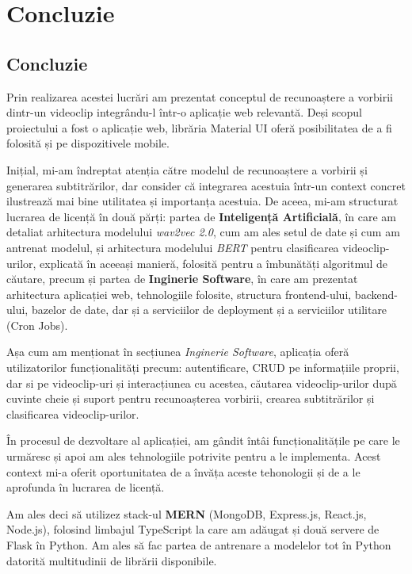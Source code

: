 \chapter{Concluzie}

\section{Concluzie}
Prin realizarea acestei lucrări am prezentat conceptul de recunoaștere a vorbirii dintr-un videoclip 
integrându-l într-o aplicație web relevantă. Deși scopul proiectului a fost o aplicație web,
librăria Material UI oferă posibilitatea de a fi folosită și pe dispozitivele mobile.
\par
Inițial, mi-am îndreptat atenția către modelul de recunoaștere a vorbirii și generarea subtitrărilor,
dar consider că  integrarea acestuia într-un context concret ilustrează mai bine utilitatea și
importanța acestuia. De aceea, mi-am structurat lucrarea de licență în două părți: partea de
\textbf{Inteligență Artificială}, în care am detaliat arhitectura modelului \textit{wav2vec 2.0},
cum am ales setul de date și cum am antrenat modelul, și arhitectura modelului \textit{BERT}
pentru clasificarea videoclip-urilor, explicată în aceeași manieră, folosită pentru a îmbunătăți
algoritmul de căutare, precum și partea de \textbf{Inginerie Software}, în care am prezentat arhitectura
aplicației web, tehnologiile folosite, structura frontend-ului, backend-ului, bazelor de date,
dar și a serviciilor de deployment și a serviciilor utilitare (Cron Jobs).
\par
Așa cum am menționat în secțiunea \textit{Inginerie Software}, aplicația oferă utilizatorilor
funcționalități precum: autentificare, CRUD pe informațiile proprii, dar si pe videoclip-uri și
interacțiunea cu acestea, căutarea videoclip-urilor după cuvinte cheie și suport pentru recunoașterea
vorbirii, crearea subtitrărilor și clasificarea videoclip-urilor.
\par
În procesul de dezvoltare al aplicației, am gândit întâi funcționalitățile pe care le urmăresc
și apoi am ales tehnologiile potrivite pentru a le implementa. Acest context mi-a oferit 
oportunitatea de a învăța aceste tehonologii și de a le aprofunda în lucrarea de licență.
\par
Am ales deci să utilizez stack-ul \textbf{MERN} (MongoDB, Express.js, React.js, Node.js), folosind 
limbajul TypeScript la care am  adăugat și două servere de Flask în Python. Am ales să fac partea
de antrenare a modelelor tot în Python datorită multitudinii de librării disponibile.
